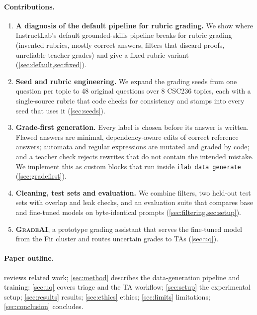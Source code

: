 \documentclass[11pt,a4paper]{article}
\newcommand{\gradeai}{\textsc{GradeAI}}
\theoremstyle{definition}
\begin{document}
\paragraph{Contributions.}
\begin{enumerate}[leftmargin=*,itemsep=2pt]
  \item \textbf{A diagnosis of the default pipeline for rubric grading.} We show where InstructLab's default grounded-skills pipeline breaks for rubric grading (invented rubrics, mostly correct answers, filters that discard proofs, unreliable teacher grades) and give a fixed-rubric variant (\cref{sec:default,sec:fixed}).
  \item \textbf{Seed and rubric engineering.} We expand the grading seeds from one question per topic to 48 original questions over 8 CSC236 topics, each with a single-source rubric that code checks for consistency and stamps into every seed that uses it (\cref{sec:seeds}).
  \item \textbf{Grade-first generation.} Every label is chosen before its answer is written. Flawed answers are minimal, dependency-aware edits of correct reference answers; automata and regular expressions are mutated and graded by code; and a teacher check rejects rewrites that do not contain the intended mistake. We implement this as custom blocks that run inside \texttt{ilab data generate} (\cref{sec:gradefirst}).
  \item \textbf{Cleaning, test sets and evaluation.} We combine filters, two held-out test sets with overlap and leak checks, and an evaluation suite that compares base and fine-tuned models on byte-identical prompts (\cref{sec:filtering,sec:setup}).
  \item \textbf{\gradeai{}}, a prototype grading assistant that serves the fine-tuned model from the Fir cluster and routes uncertain grades to TAs (\cref{sec:uq}).
\end{enumerate}

\paragraph{Paper outline.}
 reviews related work; \cref{sec:method} describes the data-generation pipeline and training;
\cref{sec:uq} covers triage and the TA workflow; \cref{sec:setup} the experimental setup;
\cref{sec:results} results; \cref{sec:ethics} ethics; \cref{sec:limits} limitations;
\cref{sec:conclusion} concludes.

\end{document}

